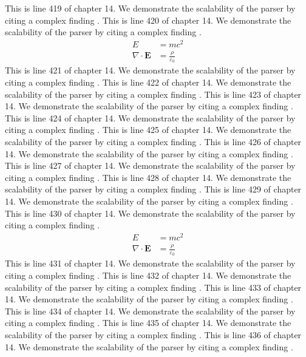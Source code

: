 This is line 419 of chapter 14. We demonstrate the scalability of the parser by citing a complex finding \cite{ref14_419}.
This is line 420 of chapter 14. We demonstrate the scalability of the parser by citing a complex finding \cite{ref14_420}.
\begin{align*}
  E &= mc^2 \\
  \nabla \cdot \mathbf{E} &= \frac{\rho}{\varepsilon_0}
\end{align*}
This is line 421 of chapter 14. We demonstrate the scalability of the parser by citing a complex finding \cite{ref14_421}.
This is line 422 of chapter 14. We demonstrate the scalability of the parser by citing a complex finding \cite{ref14_422}.
This is line 423 of chapter 14. We demonstrate the scalability of the parser by citing a complex finding \cite{ref14_423}.
This is line 424 of chapter 14. We demonstrate the scalability of the parser by citing a complex finding \cite{ref14_424}.
This is line 425 of chapter 14. We demonstrate the scalability of the parser by citing a complex finding \cite{ref14_425}.
This is line 426 of chapter 14. We demonstrate the scalability of the parser by citing a complex finding \cite{ref14_426}.
This is line 427 of chapter 14. We demonstrate the scalability of the parser by citing a complex finding \cite{ref14_427}.
This is line 428 of chapter 14. We demonstrate the scalability of the parser by citing a complex finding \cite{ref14_428}.
This is line 429 of chapter 14. We demonstrate the scalability of the parser by citing a complex finding \cite{ref14_429}.
This is line 430 of chapter 14. We demonstrate the scalability of the parser by citing a complex finding \cite{ref14_430}.
\begin{align*}
  E &= mc^2 \\
  \nabla \cdot \mathbf{E} &= \frac{\rho}{\varepsilon_0}
\end{align*}
This is line 431 of chapter 14. We demonstrate the scalability of the parser by citing a complex finding \cite{ref14_431}.
This is line 432 of chapter 14. We demonstrate the scalability of the parser by citing a complex finding \cite{ref14_432}.
This is line 433 of chapter 14. We demonstrate the scalability of the parser by citing a complex finding \cite{ref14_433}.
This is line 434 of chapter 14. We demonstrate the scalability of the parser by citing a complex finding \cite{ref14_434}.
This is line 435 of chapter 14. We demonstrate the scalability of the parser by citing a complex finding \cite{ref14_435}.
This is line 436 of chapter 14. We demonstrate the scalability of the parser by citing a complex finding \cite{ref14_436}.
